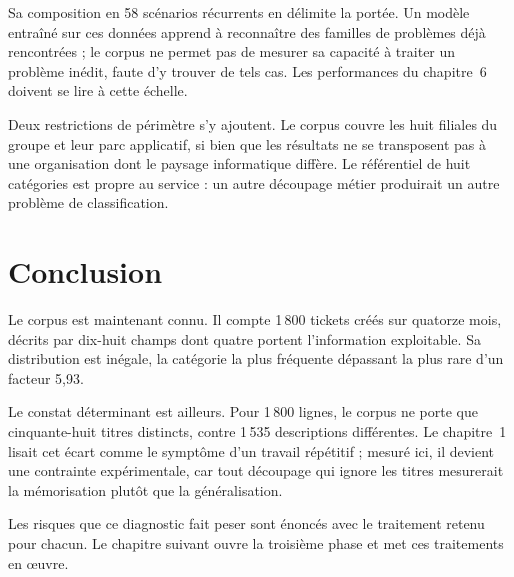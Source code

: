 Sa composition en 58 scénarios récurrents en délimite la portée. Un modèle entraîné sur ces données
apprend à reconnaître des familles de problèmes déjà rencontrées ; le corpus ne permet pas de
mesurer sa capacité à traiter un problème inédit, faute d'y trouver de tels cas. Les performances
du chapitre~6 doivent se lire à cette échelle.

Deux restrictions de périmètre s'y ajoutent. Le corpus couvre les huit filiales du groupe et leur
parc applicatif, si bien que les résultats ne se transposent pas à une organisation dont le paysage
informatique diffère. Le référentiel de huit catégories est propre au service : un autre découpage
métier produirait un autre problème de classification.


\FloatBarrier

\section*{Conclusion}

Le corpus est maintenant connu. Il compte 1\,800 tickets créés sur quatorze mois, décrits par
dix-huit champs dont quatre portent l'information exploitable. Sa distribution est inégale, la
catégorie la plus fréquente dépassant la plus rare d'un facteur 5,93.

Le constat déterminant est ailleurs. Pour 1\,800 lignes, le corpus ne porte que cinquante-huit
titres distincts, contre 1\,535 descriptions différentes. Le chapitre~1 lisait cet écart comme le
symptôme d'un travail répétitif ; mesuré ici, il devient une contrainte expérimentale, car tout
découpage qui ignore les titres mesurerait la mémorisation plutôt que la généralisation.

Les risques que ce diagnostic fait peser sont énoncés avec le traitement retenu pour chacun. Le
chapitre suivant ouvre la troisième phase et met ces traitements en œuvre.

